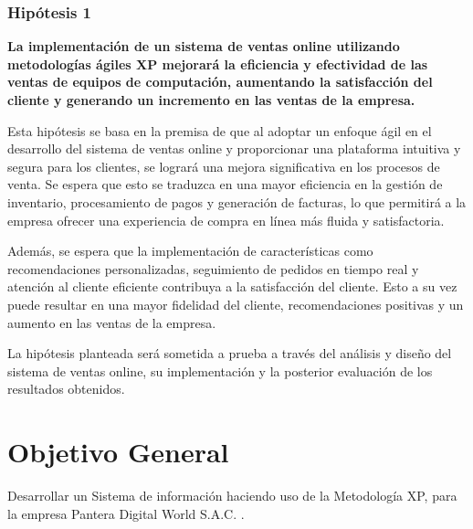 \documentclass[12pt,a4paper]{article}
\newcommand{\espacio}{\par\vspace{3mm}}
\newcommand{\newsection}[1]{\section{\hspace{4mm} #1}}%
\newcommand{\empresa}{Pantera Digital World S.A.C. }
\begin{document}
\subsubsection*{Hipótesis 1} 
\textbf{La implementación de un sistema de ventas online utilizando metodologías ágiles XP mejorará la eficiencia y efectividad de las ventas de equipos de computación, aumentando la satisfacción del cliente y generando un incremento en las ventas de la empresa.}
\espacio
Esta hipótesis se basa en la premisa de que al adoptar un enfoque ágil en el desarrollo del sistema de ventas online y proporcionar una plataforma intuitiva y segura para los clientes, se logrará una mejora significativa en los procesos de venta. Se espera que esto se traduzca en una mayor eficiencia en la gestión de inventario, procesamiento de pagos y generación de facturas, lo que permitirá a la empresa ofrecer una experiencia de compra en línea más fluida y satisfactoria.
\espacio
Además, se espera que la implementación de características como recomendaciones personalizadas, seguimiento de pedidos en tiempo real y atención al cliente eficiente contribuya a la satisfacción del cliente. Esto a su vez puede resultar en una mayor fidelidad del cliente, recomendaciones positivas y un aumento en las ventas de la empresa.
\espacio
La hipótesis planteada será sometida a prueba a través del análisis y diseño del sistema de ventas online, su implementación y la posterior evaluación de los resultados obtenidos.



\newpage
\newsection{Objetivo General}
Desarrollar un Sistema de información haciendo uso de la Metodología XP, para la empresa \empresa.
\end{document}

